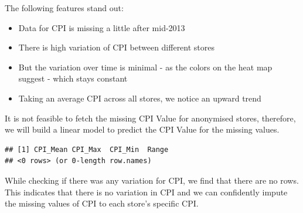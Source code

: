 \documentclass[]{article}
\newenvironment{Shaded}{\begin{snugshade}}{\end{snugshade}}
\newcommand{\KeywordTok}[1]{\textcolor[rgb]{0.13,0.29,0.53}{\textbf{{#1}}}}
\newcommand{\DataTypeTok}[1]{\textcolor[rgb]{0.13,0.29,0.53}{{#1}}}
\newcommand{\DecValTok}[1]{\textcolor[rgb]{0.00,0.00,0.81}{{#1}}}
\newcommand{\StringTok}[1]{\textcolor[rgb]{0.31,0.60,0.02}{{#1}}}
\newcommand{\NormalTok}[1]{{#1}}
\begin{document}
The following features stand out:

\begin{itemize}
\itemsep1pt\parskip0pt
\item
  Data for CPI is missing a little after mid-2013
\item
  There is high variation of CPI between different stores
\item
  But the variation over time is minimal - as the colors on the heat map
  suggest - which stays constant
\item
  Taking an average CPI across all stores, we notice an upward trend
\end{itemize}

It is not feasible to fetch the missing CPI Value for anonymised stores,
therefore, we will build a linear model to predict the CPI Value for the
missing values.

\begin{Shaded}
\end{Shaded}

\begin{verbatim}
## [1] CPI_Mean CPI_Max  CPI_Min  Range   
## <0 rows> (or 0-length row.names)
\end{verbatim}

While checking if there was any variation for CPI, we find that there
are no rows. This indicates that there is no variation in CPI and we can
confidently impute the missing values of CPI to each store's specific
CPI.
\end{document}
